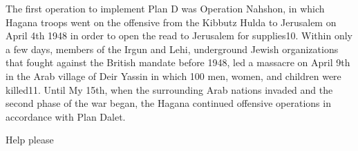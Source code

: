 \documentclass{turabian-researchpaper}
\begin{document}
The first operation to implement Plan D was Operation Nahshon, in which Hagana troops went on the offensive from the Kibbutz Hulda to Jerusalem on April 4th 1948 in order to open the read to Jerusalem for supplies10.  Within only a few days, members of the Irgun and Lehi, underground Jewish organizations that fought against the British mandate before 1948, led a massacre on April 9th in the Arab village of Deir Yassin in which 100 men, women, and children were killed11.  Until My 15th, when the surrounding Arab nations invaded and the second phase of the war began, the Hagana continued offensive operations in accordance with Plan Dalet.
\cite{doe13}

\printbibliography{}

Help please
\end{document}
